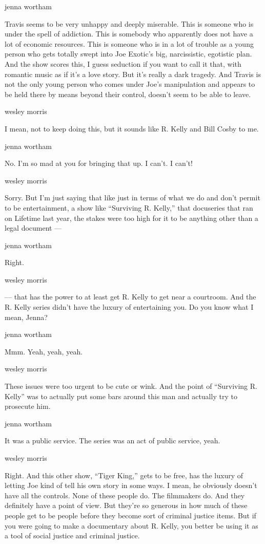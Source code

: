 jenna wortham

Travis seems to be very unhappy and deeply miserable. This is someone
who is under the spell of addiction. This is somebody who apparently
does not have a lot of economic resources. This is someone who is in a
lot of trouble as a young person who gets totally swept into Joe
Exotic's big, narcissistic, egotistic plan. And the show scores this, I
guess seduction if you want to call it that, with romantic music as if
it's a love story. But it's really a dark tragedy. And Travis is not the
only young person who comes under Joe's manipulation and appears to be
held there by means beyond their control, doesn't seem to be able to
leave.

wesley morris

I mean, not to keep doing this, but it sounds like R. Kelly and Bill
Cosby to me.

jenna wortham

No. I'm so mad at you for bringing that up. I can't. I can't!

wesley morris

Sorry. But I'm just saying that like just in terms of what we do and
don't permit to be entertainment, a show like ``Surviving R. Kelly,''
that docuseries that ran on Lifetime last year, the stakes were too high
for it to be anything other than a legal document ---

jenna wortham

Right.

wesley morris

--- that has the power to at least get R. Kelly to get near a courtroom.
And the R. Kelly series didn't have the luxury of entertaining you. Do
you know what I mean, Jenna?

jenna wortham

Mmm. Yeah, yeah, yeah.

wesley morris

These issues were too urgent to be cute or wink. And the point of
``Surviving R. Kelly'' was to actually put some bars around this man and
actually try to prosecute him.

jenna wortham

It was a public service. The series was an act of public service, yeah.

wesley morris

Right. And this other show, ``Tiger King,'' gets to be free, has the
luxury of letting Joe kind of tell his own story in some ways. I mean,
he obviously doesn't have all the controls. None of these people do. The
filmmakers do. And they definitely have a point of view. But they're so
generous in how much of these people get to be people before they become
sort of criminal justice items. But if you were going to make a
documentary about R. Kelly, you better be using it as a tool of social
justice and criminal justice.

